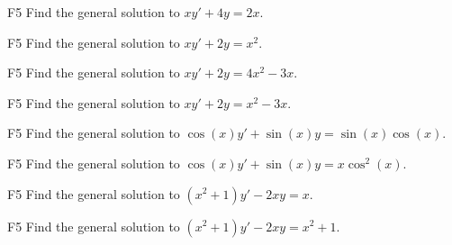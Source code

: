 \begin{problem}{F5}
Find the general solution to \(xy' + 4y = 2x\).
\end{problem}

\begin{problem}{F5}
Find the general solution to \(xy' + 2y = x^2\).
\end{problem}

\begin{problem}{F5}
Find the general solution to \(xy' + 2y = 4x^2-3x\).
\end{problem}

\begin{problem}{F5}
Find the general solution to \(xy' + 2y = x^2-3x\).
\end{problem}

\begin{problem}{F5}
Find the general solution to \(\cos(x) y' + \sin (x)y = \sin(x)\cos(x) \).
\end{problem}

\begin{problem}{F5}
Find the general solution to \(\cos(x) y' + \sin (x)y = x \cos^2(x) \).
\end{problem}

\begin{problem}{F5}
Find the general solution to \((x^2+1)y' - 2xy =x \).
\end{problem}

\begin{problem}{F5}
Find the general solution to \((x^2+1)y' - 2xy =x^2+1 \).
\end{problem}
